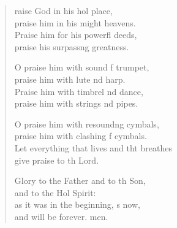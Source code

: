 \settowidth{\versewidth}{Let everything that lives and that breathes *}
\begin{verse}%
  \begin{patverse}
raise God in his hol place,\Med\\
praise him in his might heavens.\\
Praise him for his powerfl deeds,\Med\\
praise his surpass\pointup{\i}ng greatness.

O praise him with sound f trumpet,\Med\\
praise him with lute nd harp.\\
Praise him with timbrel nd dance,\Med\\
praise him with strings nd pipes.

O praise him with resound\pointup{\i}ng cymbals,\Med\\
praise him with clashing f cymbals.\\
Let everything that lives and tht breathes\Med\\
give praise to th Lord.

Glory to the Father and to th Son,\Med\\
and to the Hol Spirit:\\
as it was in the beginning, \pointup{\i}s now,\Med\\
and will be forever. men. 
  \end{patverse}
\end{verse}
